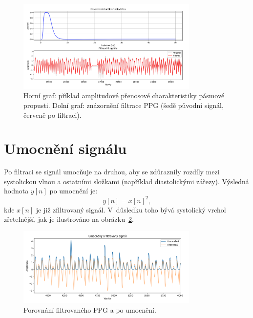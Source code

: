 \begin{figure}[htbp]
	\centering
	\includegraphics[width=0.8\textwidth]{./obrazky/ElgendiBandpass.png}
	\caption[Filtrace PPG signálu]{Horní graf: příklad amplitudové přenosové charakteristiky pásmové propusti. Dolní graf: znázornění filtrace PPG (šedě původní signál, červeně po filtraci).}
	\label{fig:filter-example}
\end{figure}

\section{Umocnění signálu}
Po filtraci se signál umocňuje na druhou, aby se zdůraznily rozdíly mezi systolickou vlnou a ostatními složkami (například diastolickými zářezy).
Výsledná hodnota $y[n]$ po umocnění je:
\begin{equation}
	y[n] = x[n]^2,
	\label{eq:square}
\end{equation}
kde $x[n]$ je již zfiltrovaný signál. V~důsledku toho bývá systolický vrchol zřetelnější, jak je ilustrováno na obrázku~\ref{fig:squared-signal}.

\begin{figure}[htbp]
	\centering
	\includegraphics[width=0.8\textwidth]{./obrazky/ElgendiUpravenySignal.png}
	\caption[Umocněný a filtrovaný PPG]{Porovnání filtrovaného PPG a po umocnění.}
	\label{fig:squared-signal}
\end{figure}

